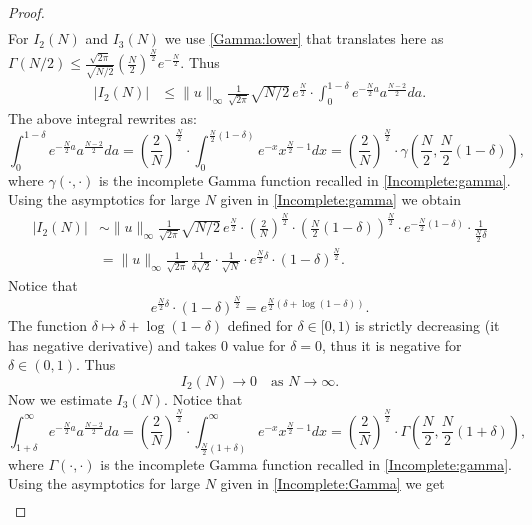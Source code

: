 \documentclass[11pt, twoside, notitlepage]{amsart}
\numberwithin{equation}{section}
\begin{document}
\begin{proof}
\begin{align*}
  \end{align*}
  For $I_2(N)$ and $I_3(N)$ we use \eqref{Gamma:lower} that translates here as $ \Gamma(N/2)  \le  \frac{\sqrt{2\pi}}{\sqrt{N/2}} \left(\frac{N}{2}\right) ^ \frac{N}{2} e^{-\frac{N}{2}}$. Thus
 \begin{align*}
 | I_2(N)| & \le  \|u\|_\infty \frac{1}{\sqrt{2\pi}} \sqrt{N/2} \,  e^{\frac{N}{2}}\cdot \int_0^{1-\delta}   e^{ - \frac{ N  }{2 }  a}  a^{\frac{N-2}{2}  } da.
    \end{align*}
The above integral rewrites as:
$$ \int_0^{1-\delta}    e^{ - \frac{ N  }{2 }  a}  a^{\frac{N-2}{2}  } da = \left(\frac{2}{N} \right)^{\frac{N}{2}} \cdot \int_0^{\frac{N}{2}( 1-\delta)}    e^{ - x}  x^{\frac{N}{2}-1  } dx = \left(\frac{2}{N} \right)^{\frac{N}{2}} \cdot \gamma\left(\frac{N}{2},\frac{N}{2}(1-\delta) \right),$$
where $\gamma (\cdot,\cdot)$ is the incomplete Gamma function recalled in \eqref{Incomplete:gamma}.
Using  the asymptotics for large $N$ given in \eqref{Incomplete:gamma} we obtain
\begin{align*}
 | I_2(N)| &\sim \|u\|_\infty \frac{1}{\sqrt{2\pi}} \sqrt{N/2} \,  e^{\frac{N}{2}}\cdot  \left(\frac{2}{N} \right)^{\frac{N}{2}} \cdot \left( \frac{N}{2}(1-\delta) \right)^{\frac{N}{2}} \cdot e^{- \frac{N}{2}(1-\delta)}\cdot \frac{1}{\frac{N}{2} \delta} \\
 &=  \|u\|_\infty \frac{1}{\sqrt{2\pi}} \, \frac{1}{\delta \sqrt{2}} \cdot  \frac{1}{\sqrt{N}} \cdot e^{ \frac{N}{2}\delta }\cdot  \left( 1-\delta \right)^{\frac{N}{2}}.
    \end{align*}
Notice that
$$ e^{ \frac{N}{2}\delta }\cdot  \left( 1-\delta \right)^{\frac{N}{2}} = e^{ \frac{N}{2} \left( \delta + \log(1-\delta) \right) }. $$
The function $\delta \mapsto \delta + \log(1-\delta)$ defined for $\delta \in [0,1)$ is strictly decreasing (it has negative derivative) and takes $0$ value for $\delta=0$, thus it is negative for $\delta \in (0,1).$
Thus
$$I_2(N) \to 0  \quad  \text{as } N \to \infty.$$
Now we estimate $I_3(N)$. Notice that
$$ \int_{1+\delta}^\infty    e^{ - \frac{ N  }{2 }  a}  a^{\frac{N-2}{2}  } da = \left(\frac{2}{N} \right)^{\frac{N}{2}} \cdot \int_{\frac{N}{2}( 1+\delta)}^\infty    e^{ - x}  x^{\frac{N}{2}-1  } dx = \left(\frac{2}{N} \right)^{\frac{N}{2}} \cdot \Gamma\left(\frac{N}{2},\frac{N}{2}(1+\delta) \right),$$
where $\Gamma (\cdot,\cdot)$ is the incomplete Gamma function recalled in \eqref{Incomplete:gamma}.
Using the asymptotics for large $N$ given in \eqref{Incomplete:Gamma} we get
\begin{align*}

\end{align*}
\end{proof}
\end{document}
